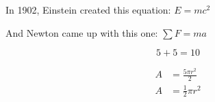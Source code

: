 \documentclass{article}
\begin{document}
    In 1902, Einstein created this equation: $E=mc^2$

    And Newton came up with this one: $\sum F=ma$

    \begin{equation}
        5+5=10
    \end{equation}

    \begin{equation}
        \begin{split}
            A & = \frac{5\pi r^2}{2} \\
            A & = \frac{1}{2} \pi r^2
        \end{split}
    \end{equation}
\end{document}
